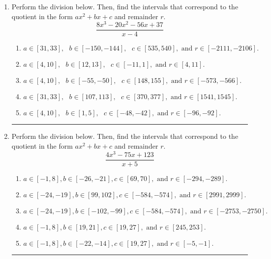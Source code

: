 \documentclass[14pt]{extbook}
\newcommand{\litem}[1]{\item#1\hspace*{-1cm}\rule{\textwidth}{0.4pt}}
\begin{document}
\begin{enumerate}
{\begin{enumerate}[label=\Alph*.]
\end{enumerate} }
\litem{
Perform the division below. Then, find the intervals that correspond to the quotient in the form $ax^2+bx+c$ and remainder $r$.\[ \frac{8x^{3} -20 x^{2} -56 x + 37}{x -4} \]\begin{enumerate}[label=\Alph*.]
\item \( a \in [31, 33], \text{   } b \in [-150, -144], \text{   } c \in [535, 540], \text{   and   } r \in [-2111, -2106]. \)
\item \( a \in [4, 10], \text{   } b \in [12, 13], \text{   } c \in [-11, 1], \text{   and   } r \in [4, 11]. \)
\item \( a \in [4, 10], \text{   } b \in [-55, -50], \text{   } c \in [148, 155], \text{   and   } r \in [-573, -566]. \)
\item \( a \in [31, 33], \text{   } b \in [107, 113], \text{   } c \in [370, 377], \text{   and   } r \in [1541, 1545]. \)
\item \( a \in [4, 10], \text{   } b \in [1, 5], \text{   } c \in [-48, -42], \text{   and   } r \in [-96, -92]. \)

\end{enumerate} }
\litem{
Perform the division below. Then, find the intervals that correspond to the quotient in the form $ax^2+bx+c$ and remainder $r$.\[ \frac{4x^{3} -75 x + 123}{x + 5} \]\begin{enumerate}[label=\Alph*.]
\item \( a \in [-1, 8], b \in [-26, -21], c \in [69, 70], \text{ and } r \in [-294, -289]. \)
\item \( a \in [-24, -19], b \in [99, 102], c \in [-584, -574], \text{ and } r \in [2991, 2999]. \)
\item \( a \in [-24, -19], b \in [-102, -99], c \in [-584, -574], \text{ and } r \in [-2753, -2750]. \)
\item \( a \in [-1, 8], b \in [19, 21], c \in [19, 27], \text{ and } r \in [245, 253]. \)
\item \( a \in [-1, 8], b \in [-22, -14], c \in [19, 27], \text{ and } r \in [-5, -1]. \)


\end{enumerate}}
\end{enumerate}
\end{document}
